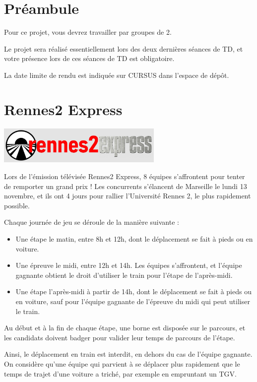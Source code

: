 \documentclass[11pt,a4paper]{article}
\begin{document}
\section{Préambule}

Pour ce projet, vous devrez travailler par groupes de 2.

Le projet sera réalisé essentiellement lors des deux dernières séances de TD, et votre présence lors de ces séances de TD est obligatoire.

La date limite de rendu est indiquée sur CURSUS dans l’espace de dépôt.

\section{Rennes2 Express}
\begin{center}
\includegraphics[width=8cm]{ProjetRennes2Express/logo.jpg}
\end{center}
Lors de l'émission télévisée Rennes2 Express, 8 équipes s'affrontent pour tenter de remporter un grand prix !
Les concurrents s'élancent de Marseille le lundi 13 novembre, et ils ont 4 jours pour rallier l'Université Rennes 2, le plus rapidement possible.

Chaque journée de jeu se déroule de la manière suivante :
\begin{itemize}
    \item Une étape le matin, entre 8h et 12h, dont le déplacement se fait à pieds ou en voiture. 
    \item Une épreuve le midi, entre 12h et 14h. Les équipes s'affrontent, et l'équipe gagnante obtient le droit d'utiliser le train pour l'étape de l'après-midi.
    \item Une étape l'après-midi à partir de 14h, dont le déplacement se fait à pieds ou en voiture, sauf pour l'équipe gagnante de l'épreuve du midi qui peut utiliser le train.
\end{itemize}

Au début et à la fin de chaque étape, une borne est disposée sur le parcours, et les candidats doivent badger pour valider leur temps de parcours de l'étape.

Ainsi, le déplacement en train est interdit, en dehors du cas de l'équipe gagnante. On considère qu'une équipe qui parvient à se déplacer plus rapidement que le temps de trajet d'une voiture a triché, par exemple en empruntant un TGV.
\end{document}
